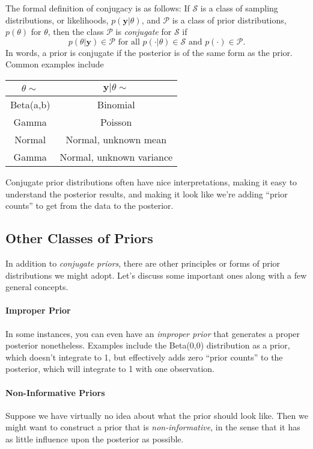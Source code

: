 \documentclass[12pt]{article}
\begin{document}
The formal definition of conjugacy is as follows: If $\mathcal{S}$ is
a class of sampling distributions, or likelihoods, 
$p(\mathbf{y} | \theta)$, and $\mathcal{P}$ is a class of prior 
distributions, $p(\theta)$ for $\theta$, then the class
$\mathcal{P}$ is \emph{conjugate} for $\mathcal{S}$ if 
   \[ p(\theta | \mathbf{y}) \in \mathcal{P} 
      \text{ for all } p(\cdot | \theta) \in 
      \mathcal{S} \text{ and } p(\cdot) \in \mathcal{P}.\]
In words, a prior is conjugate if the posterior is of the same form
as the prior. Common examples include
\begin{center}
   \begin{tabular}{ | c | c |}
      \hline
      $\theta \sim$ & $\mathbf{y}|\theta \sim$ \\
      \hline
      Beta(a,b) & Binomial \\ \hline
      Gamma & Poisson \\ \hline
      Normal & Normal, unknown mean  \\\hline
      Gamma & Normal, unknown variance \\\hline
   \end{tabular}
\end{center}
Conjugate prior distributions often have nice interpretations, making
it easy to understand the posterior results, and making it look like
we're adding ``prior counts'' to get from the data to the posterior.

\subsection{Other Classes of Priors}

In addition to \emph{conjugate priors}, there are other principles or
forms of prior distributions we might adopt. Let's discuss some 
important ones along with a few general concepts.

\paragraph{Improper Prior}
In some instances, you can even have an \emph{improper prior} that 
generates a proper posterior nonetheless. Examples include the
Beta(0,0) distribution as a prior, which doesn't integrate to 1, but
effectively adds zero ``prior counts'' to the posterior, which will
integrate to 1 with one observation.

\paragraph{Non-Informative Priors}
Suppose we have virtually no idea about what the prior should look
like. Then we might want to construct a prior that is 
\emph{non-informative}, in the sense that it has as little influence
upon the posterior as possible.
\end{document}
